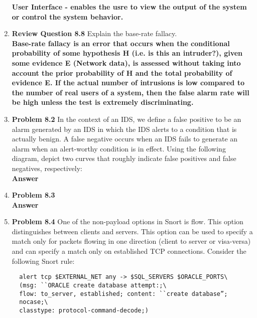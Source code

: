 \documentclass[12pt]{article}
\begin{document}
\begin{enumerate}
  \textbf{User Interface - enables the usre to view the output of the system or control the system behavior.} \\

  \item \textbf{Review Question 8.8} Explain the base-rate fallacy.\\

  \textbf{Base-rate fallacy is an error that occurs when the conditional probability of some hypothesis H (i.e. is this an intruder?), given some evidence E (Network data), is assessed without taking into account the prior probability of H and the total probability of evidence E. If the actual number of intrusions is low compared to the number of real users of a system, then the false alarm rate will be high unless the test is extremely discriminating.} \\

  \item \textbf{Problem 8.2} In the context of an IDS, we define a false positive to be an alarm generated by an IDS in which the IDS alerts to a condition that is actually benign. A false negative occurs when an IDS fails to generate an alarm when an alert-worthy condition is in effect. Using the following diagram, depict two curves that roughly indicate false positives and false negatives, respectively:\\

  \textbf{Answer} \\

  \item \textbf{Problem 8.3} \\

  \textbf{Answer} \\

  \item \textbf{Problem 8.4} One of the non-payload options in Snort is flow. This option distinguishes between clients and servers. This option can be used to specify a match only for packets flowing in one direction (client to server or visa-versa) and can specify a match only on established TCP connections. Consider the following Snort rule: \\

  {\color{blue}
  \begin{verbatim}
  alert tcp $EXTERNAL_NET any -> $SQL_SERVERS $ORACLE_PORTS\
  (msg: ``ORACLE create database attempt:;\
  flow: to_server, established; content: ``create database”;
  nocase;\
  classtype: protocol-command-decode;)
  \end{verbatim}
  }


\end{enumerate}
\end{document}
